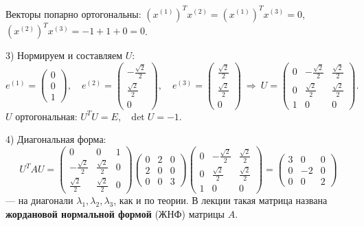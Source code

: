 \documentclass[a4paper,11pt]{article}
\begin{document}
Векторы попарно ортогональны: $(x^{(1)})^T x^{(2)} = (x^{(1)})^T x^{(3)} = 0$, \ $(x^{(2)})^T x^{(3)} = -1 + 1 + 0 = 0$. \checkmark

3) Нормируем и составляем $U$:
\[
  e^{(1)} = \begin{pmatrix} 0 \\ 0 \\ 1 \end{pmatrix}, \quad
  e^{(2)} = \begin{pmatrix} -\frac{\sqrt2}{2} \\[2pt] \frac{\sqrt2}{2} \\[2pt] 0 \end{pmatrix}, \quad
  e^{(3)} = \begin{pmatrix} \frac{\sqrt2}{2} \\[2pt] \frac{\sqrt2}{2} \\[2pt] 0 \end{pmatrix}
  \ \Rightarrow\
  U = \begin{pmatrix} 0 & -\frac{\sqrt2}{2} & \frac{\sqrt2}{2} \\[2pt] 0 & \frac{\sqrt2}{2} & \frac{\sqrt2}{2} \\[2pt] 1 & 0 & 0 \end{pmatrix}.
\]
$U$ ортогональная: $U^T U = E$, \ $\det U = -1$.

4) Диагональная форма:
\[
  U^T A U =
  \begin{pmatrix} 0 & 0 & 1 \\[2pt] -\frac{\sqrt2}{2} & \frac{\sqrt2}{2} & 0 \\[2pt] \frac{\sqrt2}{2} & \frac{\sqrt2}{2} & 0 \end{pmatrix}
  \begin{pmatrix} 0 & 2 & 0 \\ 2 & 0 & 0 \\ 0 & 0 & 3 \end{pmatrix}
  \begin{pmatrix} 0 & -\frac{\sqrt2}{2} & \frac{\sqrt2}{2} \\[2pt] 0 & \frac{\sqrt2}{2} & \frac{\sqrt2}{2} \\[2pt] 1 & 0 & 0 \end{pmatrix}
  = \begin{pmatrix} 3 & 0 & 0 \\ 0 & -2 & 0 \\ 0 & 0 & 2 \end{pmatrix}
\]
--- на диагонали $\lambda_1, \lambda_2, \lambda_3$, как и по теории. В лекции такая матрица названа
\textbf{жордановой нормальной формой} (ЖНФ) матрицы $A$.
\end{document}
